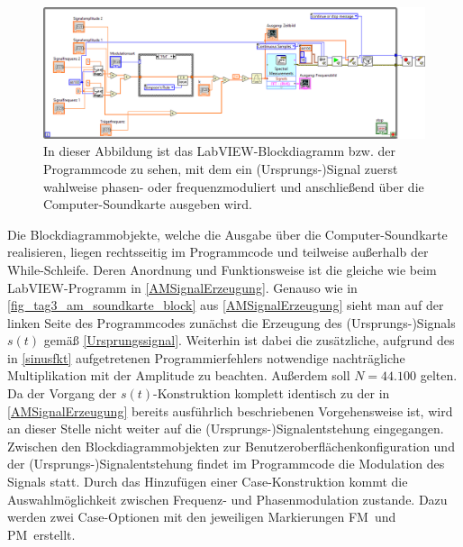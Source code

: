 \documentclass[
a4paper,
12pt,
pagesize,
ngerman
]{scrartcl}
\begin{document}
	\begin{figure}[H]
		\centering
		\includegraphics[width=1.0\textwidth]{EIRE2018Dateien/Tag4/FMPM-Erzeugung/FMPM-Erzeugungd}
		\caption{In dieser Abbildung ist das LabVIEW-Blockdiagramm bzw. der Programmcode zu sehen, mit dem ein (Ursprungs-)Signal zuerst wahlweise phasen- oder frequenzmoduliert und anschließend über die Computer-Soundkarte ausgeben wird.}
		\label{FMProgrammcode}
	\end{figure}
	\noindent Die Blockdiagrammobjekte, welche die Ausgabe über die Computer-Soundkarte realisieren, liegen rechtsseitig im Programmcode und teilweise außerhalb der While-Schleife. 
	Deren Anordnung und Funktionsweise ist die gleiche wie beim LabVIEW-Programm in \cref{AMSignalErzeugung}. 
	Genauso wie in \cref{fig_tag3_am_soundkarte_block} aus \cref{AMSignalErzeugung} sieht man auf der linken Seite des Programmcodes zunächst die Erzeugung des (Ursprungs-)Signals $s(t)$ gemäß \cref{Ursprungssignal}. 
	Weiterhin ist dabei die zusätzliche, aufgrund des in \cref{sinusfkt} aufgetretenen Programmierfehlers notwendige nachträgliche Multiplikation mit der Amplitude zu beachten. 
	Außerdem soll $N = 44.100$ gelten. 
	Da der Vorgang der $s(t)$-Konstruktion komplett identisch zu der in \cref{AMSignalErzeugung} bereits ausführlich beschriebenen Vorgehensweise ist, wird an dieser Stelle nicht weiter auf die (Ursprungs-)Signalentstehung eingegangen. 
	Zwischen den Blockdiagrammobjekten zur Benutzeroberflächenkonfiguration und der (Ursprungs-)Signalentstehung findet im Programmcode die Modulation des Signals statt. 
	Durch das Hinzufügen einer Case-Konstruktion kommt die Auswahlmöglichkeit zwischen Frequenz- und Phasenmodulation zustande. 
	Dazu werden zwei Case-Optionen mit den jeweiligen Markierungen \glqq FM\grqq\ und \glqq PM\grqq\ erstellt. 
\end{document}
